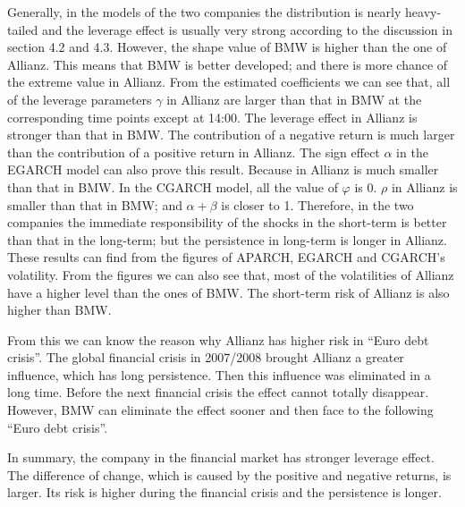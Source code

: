 Generally, in the models of the two companies the distribution is nearly heavy-tailed and the leverage effect is usually very strong according to the discussion in section 4.2 and 4.3. However, the shape value of BMW is higher than the one of Allianz. This means that BMW is better developed; and there is more chance of the extreme value in Allianz. From the estimated coefficients we can see that, all of the leverage parameters $\gamma$ in Allianz are larger than that in BMW at the corresponding time points except at 14:00. The leverage effect in Allianz is stronger than that in BMW. The contribution of a negative return is much larger than the contribution of a positive return in Allianz. The sign effect $\alpha$ in the EGARCH model can also prove this result. Because in Allianz is much smaller than that in BMW. In the CGARCH model, all the value of $\varphi$ is 0. $\rho$ in Allianz is smaller than that in BMW; and $\alpha + \beta$ is closer to 1. Therefore, in the two companies the immediate responsibility of the shocks in the short-term is better than that in the long-term; but the persistence in long-term is longer in Allianz. These results can find from the figures of APARCH, EGARCH and CGARCH's volatility. From the figures we can also see that, most of the volatilities of Allianz have a higher level than the ones of BMW. The short-term risk of Allianz is also higher than BMW.

From this we can know the reason why Allianz has higher risk in ``Euro debt crisis''. The global financial crisis in 2007/2008 brought Allianz a greater influence, which has long persistence. Then this influence was eliminated in a long time. Before the next financial crisis the effect cannot totally disappear. However, BMW can eliminate the effect sooner and then face to the following ``Euro debt crisis''. 

In summary, the company in the financial market has stronger leverage effect. The difference of change, which is caused by the positive and negative returns, is larger. Its risk is higher during the financial crisis and the persistence is longer.
